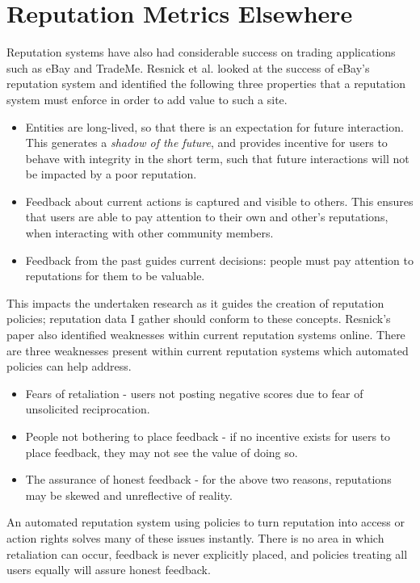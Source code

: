 \section{Reputation Metrics Elsewhere}

Reputation systems have also had considerable success on trading applications such as eBay and TradeMe. Resnick et al. \cite{resnick2000reputation,resnick2002trust} looked at the success of eBay's reputation system and identified the following three properties that a reputation system must enforce in order to add value to such a site. 

\begin{itemize}
 \item Entities are long-lived, so that there is an expectation for future interaction. This generates a \textit{shadow of the future}, and provides incentive for users to behave with integrity in the short term, such that future interactions will not be impacted by a poor reputation. 
 \item Feedback about current actions is captured and visible to others. This ensures that users are able to pay attention to their own and other's reputations, when interacting with other community members. 
 \item Feedback from the past guides current decisions: people must pay attention to reputations for them to be valuable. 
\end{itemize}

This impacts the undertaken research as it guides the creation of reputation policies; reputation data I gather should conform to these concepts. Resnick's paper also identified weaknesses within current reputation systems online. There are three weaknesses present within current reputation systems which automated policies can help address. 

\begin{itemize}
 \item Fears of retaliation - users not posting negative scores due to fear of unsolicited reciprocation.
 \item People not bothering to place feedback - if no incentive exists for users to place feedback, they may not see the value of doing so.
 \item The assurance of honest feedback - for the above two reasons, reputations may be skewed and unreflective of reality.
\end{itemize}

An automated reputation system using policies to turn reputation into access or action rights solves many of these issues instantly. There is no area in which retaliation can occur, feedback is never explicitly placed, and policies treating all users equally will assure honest feedback.


